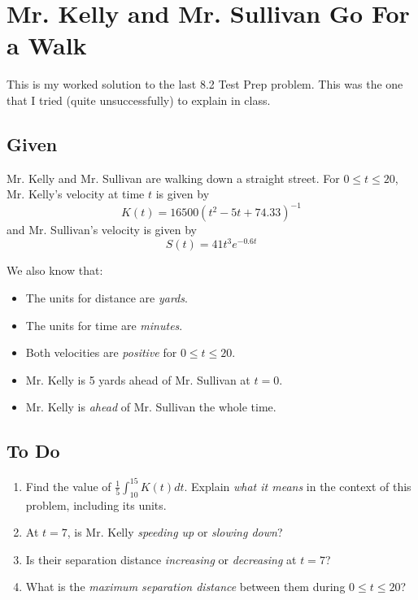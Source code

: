 \documentclass[12pt,letterpaper]{memoir}
\begin{document}
\pagestyle{plain}
\checkandfixthelayout
\raggedbottom

\setlength{\parindent}{0in}
\setlength{\parskip}{\onelineskip}

\chapter*{Mr. Kelly and Mr. Sullivan Go For a Walk}
This is my worked solution to the last 8.2 Test Prep problem. 
This was the one that I tried (quite unsuccessfully) to explain in class. 

\section{Given} 

Mr. Kelly and Mr. Sullivan are walking down a straight street.
For $0 \le t \le 20$,
Mr. Kelly's velocity at time $t$ is given by 
%
\begin{equation*}
    K(t) = 16500 (t^2 - 5t + 74.33)^{-1} 
\end{equation*}
%
and Mr. Sullivan's velocity is given by 
%
\begin{equation*}
    S(t) = 41 t^3 e^{-0.6t} 
\end{equation*}

We also know that:
\begin{itemize}[nosep]
    \item The units for distance are {\itshape yards}.
    \item The units for time are {\itshape minutes}.
    \item Both velocities are {\itshape positive} for $0 \le t \le 20$.
    \item Mr. Kelly is 5 yards ahead of Mr. Sullivan at $t=0$.
    \item Mr. Kelly is {\itshape ahead} of Mr. Sullivan the whole time.
\end{itemize}
 
\section{To Do}
\begin{enumerate}[nosep]
    \item {} Find the value of 
    $\frac{1}{5}  \int_{10}^{15}K(t)dt$. 
    Explain {\itshape what it means} in the context of this problem, including its units.
    \item {} At $t=7$, is Mr. Kelly {\itshape speeding up} or {\itshape slowing down}? 
    \item {} Is their separation distance {\itshape increasing} or {\itshape decreasing} at $t=7$? 
    \item {} What is the {\itshape maximum separation distance} between them during $0\le t\le20$?
\end{enumerate}
\end{document}
